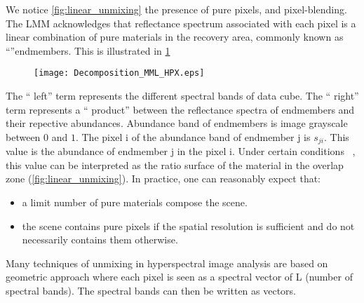 We notice \ref{fig:linear_unmixing} the
presence of pure pixels, and pixel-blending. The LMM acknowledges that
reflectance spectrum associated with each pixel is a linear combination of pure materials in the recovery area, commonly known as ``''endmembers. This is illustrated in \ref{fig:decomp_mml}

\begin{figure}[h]
  \centering
  \texttt{[image: Decomposition\_MML\_HPX.eps]}
  \label{fig:decomp_mml}
\end{figure}
The `` left'' term represents the different spectral bands of
data cube. The `` right'' term represents a `` product''
between the reflectance spectra of endmembers and their repective abundances. Abundance band of endmembers is
image grayscale between $0$ and $1$. The pixel i of the
abundance band of endmember j is $s_ {ji}$. This value is the
abundance of endmember j in the pixel i. Under certain conditions
~\cite{Huck2009}, this value can be interpreted as the ratio
surface of the material in the overlap zone (\ref{fig:linear_unmixing}). In
practice, one can reasonably expect that: 

\begin{itemize}
\item{a limit number
of pure materials compose the scene.}
\item{the scene contains pure pixels if the spatial resolution is sufficient and
do not necessarily contains them otherwise.}
\end{itemize}

Many techniques of unmixing in hyperspectral image analysis
are based on geometric approach where each pixel is seen as a spectral
vector of L (number of spectral bands). The
spectral bands can then be written as vectors.

\begin{figure}[h]
\label{fig:mml}
\end{figure}

